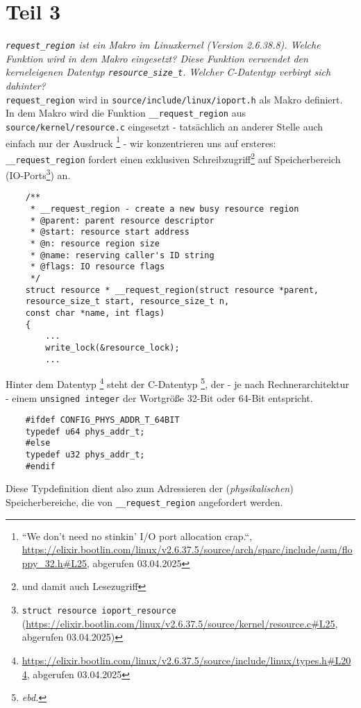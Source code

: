 \section{Teil 3}

\textit{\texttt{request\_region} ist ein Makro im Linuxkernel (Version 2.6.38.8). Welche Funktion wird in dem Makro eingesetzt? Diese Funktion verwendet
den kerneleigenen Datentyp \texttt{resource\_size\_t}. Welcher C-Datentyp
verbirgt sich dahinter?}\\


\noindent
\texttt{request\_region} wird in \texttt{source/include/linux/ioport.h} als Makro definiert.\\
In dem Makro wird die Funktion \texttt{\_\_request\_region} aus \texttt{source/kernel/resource.c} eingesetzt - tatsächlich an anderer Stelle auch einfach nur der Ausdruck \footnote{
``We don't need no stinkin' I/O port allocation crap.``, \url{https://elixir.bootlin.com/linux/v2.6.37.5/source/arch/sparc/include/asm/floppy_32.h#L25}, abgerufen 03.04.2025
} - wir konzentrieren uns auf ersteres:  \texttt{\_\_request\_region} fordert einen exklusiven Schreibzugriff\footnote{
und damit auch Lesezugriff
} auf Speicherbereich (IO-Ports\footnote{
\texttt{struct resource ioport\_resource} (\url{https://elixir.bootlin.com/linux/v2.6.37.5/source/kernel/resource.c#L25}, abgerufen 03.04.2025)
}) an.\\

\begin{verbatim}
    /**
     * __request_region - create a new busy resource region
     * @parent: parent resource descriptor
     * @start: resource start address
     * @n: resource region size
     * @name: reserving caller's ID string
     * @flags: IO resource flags
     */
    struct resource * __request_region(struct resource *parent,
    resource_size_t start, resource_size_t n,
    const char *name, int flags)
    {
        ...
        write_lock(&resource_lock);
        ...
\end{verbatim}

\noindent
Hinter dem Datentyp \footnote{
\url{https://elixir.bootlin.com/linux/v2.6.37.5/source/include/linux/types.h#L204}, abgerufen 03.04.2025
} steht der C-Datentyp \footnote{\textit{ebd.}}, der - je nach Rechnerarchitektur - einem \texttt{unsigned integer} der Wortgröße 32-Bit oder 64-Bit entspricht.

\begin{verbatim}
    #ifdef CONFIG_PHYS_ADDR_T_64BIT
    typedef u64 phys_addr_t;
    #else
    typedef u32 phys_addr_t;
    #endif
\end{verbatim}

\noindent
Diese Typdefinition dient also zum Adressieren der (\textit{physikalischen}) Speicherbereiche, die von \texttt{\_\_request\_region} angefordert werden.